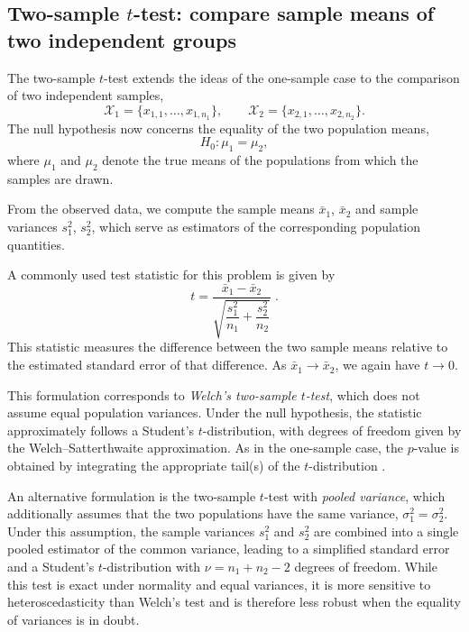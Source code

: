 \subsection{Two-sample \(t\)-test: compare sample means of two independent groups}

The two-sample \(t\)-test extends the ideas of the one-sample case to the comparison of two independent samples,
\[
\mathcal{X}_1 = \{x_{1,1}, \dots, x_{1,n_1}\},
\qquad
\mathcal{X}_2 = \{x_{2,1}, \dots, x_{2,n_2}\}.
\]
The null hypothesis now concerns the equality of the two population means,
\[
H_0 : \mu_1 = \mu_2 ,
\]
where \(\mu_1\) and \(\mu_2\) denote the true means of the populations from which the samples are drawn.

\medskip

From the observed data, we compute the sample means \(\bar{x}_1\), \(\bar{x}_2\) and sample variances \(s_1^2\), \(s_2^2\), which serve as estimators of the corresponding population quantities.

\medskip

A commonly used test statistic for this problem is given by
\begin{equation}
    t = \frac{\bar{x}_1 - \bar{x}_2}
    {\sqrt{\dfrac{s_1^2}{n_1} + \dfrac{s_2^2}{n_2}}} \; .
    \label{t_statistic_two_sample}
\end{equation}
This statistic measures the difference between the two sample means relative to the estimated standard error of that difference. As \(\bar{x}_1 \to \bar{x}_2\), we again have \(t \to 0\).

\medskip

This formulation corresponds to \textit{Welch’s two-sample \(t\)-test}, which does not assume equal population variances. Under the null hypothesis, the statistic approximately follows a Student’s \(t\)-distribution, with degrees of freedom given by the Welch–Satterthwaite approximation. As in the one-sample case, the \(p\)-value is obtained by integrating the appropriate tail(s) of the \(t\)-distribution \cite{welch_1947_generalization}.

\medskip

An alternative formulation is the two-sample \(t\)-test with \emph{pooled variance}, which additionally assumes that the two populations have the same variance, \(\sigma_1^2=\sigma_2^2\). Under this assumption, the sample variances \(s_1^2\) and \(s_2^2\) are combined into a single pooled estimator of the common variance, leading to a simplified standard error and a Student’s \(t\)-distribution with \(\nu = n_1 + n_2 - 2\) degrees of freedom. While this test is exact under normality and equal variances, it is more sensitive to heteroscedasticity than Welch’s test and is therefore less robust when the equality of variances is in doubt.

